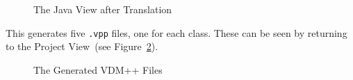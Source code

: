 \documentclass[\pformat,12pt]{article}
\newcommand{\guicmd}[1]{{\sf #1}}
\begin{document}
\begin{figure}[tbh]
\begin{center}
\caption{The Java View after Translation}\label{fig:translationDone}
\end{center}
\end{figure}

This generates five {\tt .vpp} files, one for each class. These can be
seen by returning to the \guicmd{Project View}~(see
Figure~\ref{fig:vdmFiles}). 

\begin{figure}[tbh]
\begin{center}
\caption{The Generated VDM++ Files}\label{fig:vdmFiles}
\end{center}
\end{figure}
\end{document}
